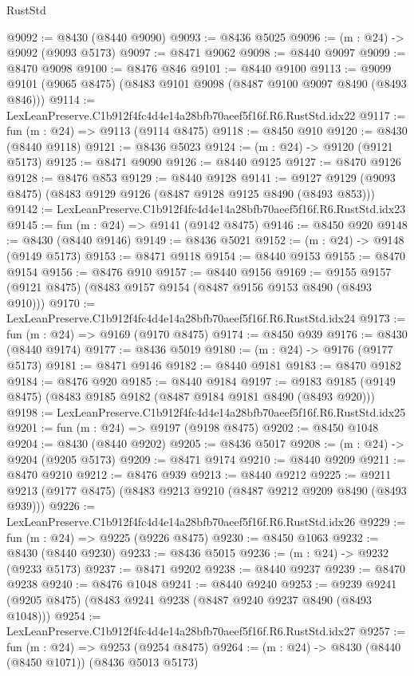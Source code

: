 \begin{lexlean}{RustStd}
\begin{coremodule}
@9092 := @8430 (@8440 @9090)
@9093 := @8436 @5025
@9096 := (m : @24) -> @9092 (@9093 @5173)
@9097 := @8471 @9062
@9098 := @8440 @9097
@9099 := @8470 @9098
@9100 := @8476 @846
@9101 := @8440 @9100
@9113 := @9099 @9101 (@9065 @8475) (@8483 @9101 @9098 (@8487 @9100 @9097 @8490 (@8493 @846)))
@9114 := LexLeanPreserve.C1b912f4fc4d4e14a28bfb70aeef5f16f.R6.RustStd.idx22
@9117 := fun (m : @24) => @9113 (@9114 @8475)
@9118 := @8450 @910
@9120 := @8430 (@8440 @9118)
@9121 := @8436 @5023
@9124 := (m : @24) -> @9120 (@9121 @5173)
@9125 := @8471 @9090
@9126 := @8440 @9125
@9127 := @8470 @9126
@9128 := @8476 @853
@9129 := @8440 @9128
@9141 := @9127 @9129 (@9093 @8475) (@8483 @9129 @9126 (@8487 @9128 @9125 @8490 (@8493 @853)))
@9142 := LexLeanPreserve.C1b912f4fc4d4e14a28bfb70aeef5f16f.R6.RustStd.idx23
@9145 := fun (m : @24) => @9141 (@9142 @8475)
@9146 := @8450 @920
@9148 := @8430 (@8440 @9146)
@9149 := @8436 @5021
@9152 := (m : @24) -> @9148 (@9149 @5173)
@9153 := @8471 @9118
@9154 := @8440 @9153
@9155 := @8470 @9154
@9156 := @8476 @910
@9157 := @8440 @9156
@9169 := @9155 @9157 (@9121 @8475) (@8483 @9157 @9154 (@8487 @9156 @9153 @8490 (@8493 @910)))
@9170 := LexLeanPreserve.C1b912f4fc4d4e14a28bfb70aeef5f16f.R6.RustStd.idx24
@9173 := fun (m : @24) => @9169 (@9170 @8475)
@9174 := @8450 @939
@9176 := @8430 (@8440 @9174)
@9177 := @8436 @5019
@9180 := (m : @24) -> @9176 (@9177 @5173)
@9181 := @8471 @9146
@9182 := @8440 @9181
@9183 := @8470 @9182
@9184 := @8476 @920
@9185 := @8440 @9184
@9197 := @9183 @9185 (@9149 @8475) (@8483 @9185 @9182 (@8487 @9184 @9181 @8490 (@8493 @920)))
@9198 := LexLeanPreserve.C1b912f4fc4d4e14a28bfb70aeef5f16f.R6.RustStd.idx25
@9201 := fun (m : @24) => @9197 (@9198 @8475)
@9202 := @8450 @1048
@9204 := @8430 (@8440 @9202)
@9205 := @8436 @5017
@9208 := (m : @24) -> @9204 (@9205 @5173)
@9209 := @8471 @9174
@9210 := @8440 @9209
@9211 := @8470 @9210
@9212 := @8476 @939
@9213 := @8440 @9212
@9225 := @9211 @9213 (@9177 @8475) (@8483 @9213 @9210 (@8487 @9212 @9209 @8490 (@8493 @939)))
@9226 := LexLeanPreserve.C1b912f4fc4d4e14a28bfb70aeef5f16f.R6.RustStd.idx26
@9229 := fun (m : @24) => @9225 (@9226 @8475)
@9230 := @8450 @1063
@9232 := @8430 (@8440 @9230)
@9233 := @8436 @5015
@9236 := (m : @24) -> @9232 (@9233 @5173)
@9237 := @8471 @9202
@9238 := @8440 @9237
@9239 := @8470 @9238
@9240 := @8476 @1048
@9241 := @8440 @9240
@9253 := @9239 @9241 (@9205 @8475) (@8483 @9241 @9238 (@8487 @9240 @9237 @8490 (@8493 @1048)))
@9254 := LexLeanPreserve.C1b912f4fc4d4e14a28bfb70aeef5f16f.R6.RustStd.idx27
@9257 := fun (m : @24) => @9253 (@9254 @8475)
@9264 := (m : @24) -> @8430 (@8440 (@8450 @1071)) (@8436 @5013 @5173)

\end{coremodule}
\end{lexlean}
